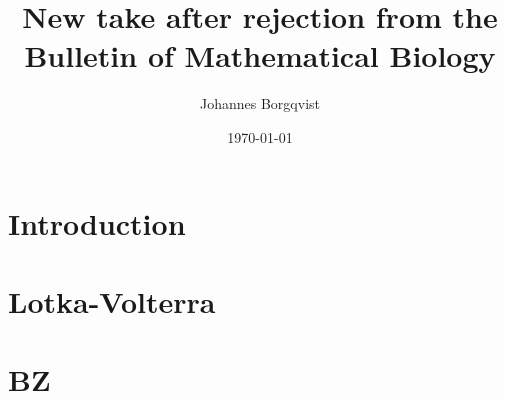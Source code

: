 \documentclass[12pt]{article}
\begin{document}
\title{\textbf{New take after rejection from the Bulletin of Mathematical Biology}}
\author{Johannes Borgqvist}
\date{\today}
\maketitle
\tableofcontents
\clearpage
\section{Introduction}

\section{Lotka-Volterra}

\section{BZ}

\end{document}
